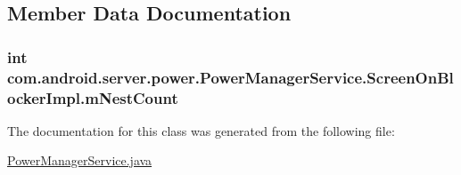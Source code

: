 \subsection{Member Data Documentation}
\hypertarget{classcom_1_1android_1_1server_1_1power_1_1PowerManagerService_1_1ScreenOnBlockerImpl_af669f3b619d62089ad8103182b92c99f}{
\subsubsection[{m\-Nest\-Count}]{\setlength{\rightskip}{0pt plus 5cm}int com.\-android.\-server.\-power.\-Power\-Manager\-Service.\-Screen\-On\-Blocker\-Impl.\-m\-Nest\-Count\hspace{0.3cm}{\ttfamily [private]}}}\label{classcom_1_1android_1_1server_1_1power_1_1PowerManagerService_1_1ScreenOnBlockerImpl_af669f3b619d62089ad8103182b92c99f}


The documentation for this class was generated from the following file\-:\begin{DoxyCompactItemize}
\item 
\hyperlink{PowerManagerService_8java}{Power\-Manager\-Service.\-java}\end{DoxyCompactItemize}
